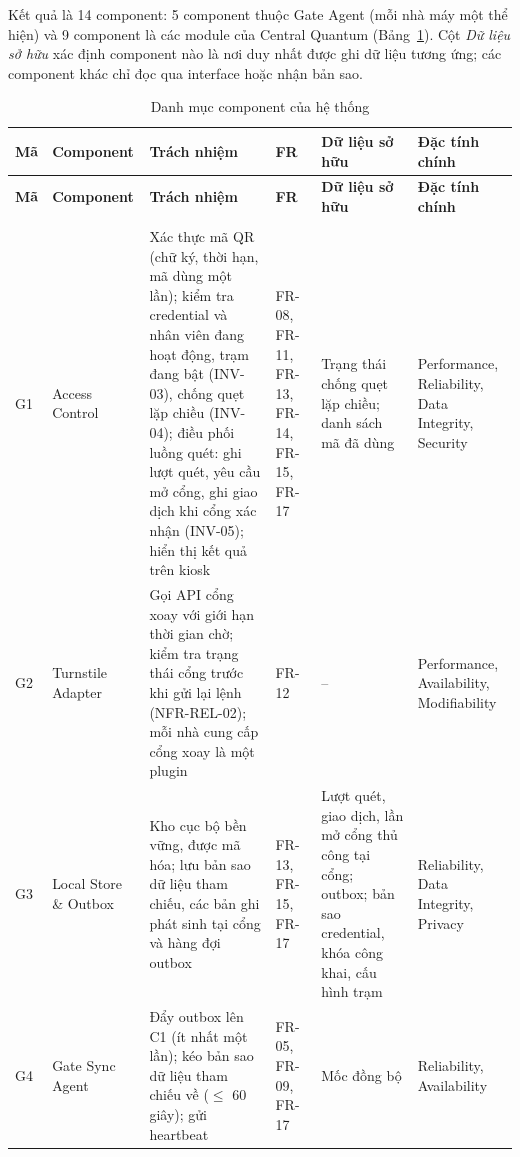 Kết quả là 14 component: 5 component thuộc Gate Agent (mỗi nhà máy một thể hiện) và 9 component là các module của Central Quantum (Bảng~\ref{tab:components}). Cột \textit{Dữ liệu sở hữu} xác định component nào là nơi duy nhất được ghi dữ liệu tương ứng; các component khác chỉ đọc qua interface hoặc nhận bản sao.

\begingroup
\small
\renewcommand{\arraystretch}{1.3}
\begin{longtable}{|>{\centering\arraybackslash}p{0.7cm}|>{\raggedright\arraybackslash}p{2.3cm}|>{\raggedright\arraybackslash}p{4.6cm}|>{\raggedright\arraybackslash}p{1.9cm}|>{\raggedright\arraybackslash}p{2.8cm}|>{\raggedright\arraybackslash}p{2.2cm}|}
\caption{Danh mục component của hệ thống}\label{tab:components}\\
\hline
\textbf{Mã} & \textbf{Component} & \textbf{Trách nhiệm} & \textbf{FR} & \textbf{Dữ liệu sở hữu} & \textbf{Đặc tính chính} \\
\hline
\endfirsthead
\hline
\textbf{Mã} & \textbf{Component} & \textbf{Trách nhiệm} & \textbf{FR} & \textbf{Dữ liệu sở hữu} & \textbf{Đặc tính chính} \\
\hline
\endhead
\hline
\endfoot
\endlastfoot
\multicolumn{6}{|l|}{\textbf{Q1 Gate Quantum -- Gate Agent (mỗi nhà máy một thể hiện)}} \\
\hline
G1 & Access Control & Xác thực mã QR (chữ ký, thời hạn, mã dùng một lần); kiểm tra credential và nhân viên đang hoạt động, trạm đang bật (INV-03), chống quẹt lặp chiều (INV-04); điều phối luồng quét: ghi lượt quét, yêu cầu mở cổng, ghi giao dịch khi cổng xác nhận (INV-05); hiển thị kết quả trên kiosk & FR-08, FR-11, FR-13, FR-14, FR-15, FR-17 & Trạng thái chống quẹt lặp chiều; danh sách mã đã dùng & Performance, Reliability, Data Integrity, Security \\
\hline
G2 & Turnstile Adapter & Gọi API cổng xoay với giới hạn thời gian chờ; kiểm tra trạng thái cổng trước khi gửi lại lệnh (NFR-REL-02); mỗi nhà cung cấp cổng xoay là một plugin & FR-12 & -- & Performance, Availability, Modifiability \\
\hline
G3 & Local Store \& Outbox & Kho cục bộ bền vững, được mã hóa; lưu bản sao dữ liệu tham chiếu, các bản ghi phát sinh tại cổng và hàng đợi outbox & FR-13, FR-15, FR-17 & Lượt quét, giao dịch, lần mở cổng thủ công tại cổng; outbox; bản sao credential, khóa công khai, cấu hình trạm & Reliability, Data Integrity, Privacy \\
\hline
G4 & Gate Sync Agent & Đẩy outbox lên C1 (ít nhất một lần); kéo bản sao dữ liệu tham chiếu về ($\le$ 60 giây); gửi heartbeat & FR-05, FR-09, FR-17 & Mốc đồng bộ & Reliability, Availability \\

\end{longtable}
